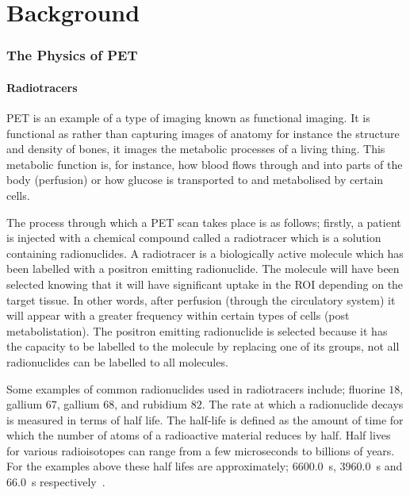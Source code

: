 \chapter{Background} \label{sec:background}
    
    
        
        
        \subsection{The Physics of PET} \label{sec:the_physics_of_pet}
            
            \subsubsection{Radiotracers} \label{sec:radiotracers}
                \gls{PET} is an example of a type of imaging known as functional imaging. It is functional as rather than capturing images of anatomy for instance the structure and density of bones, it images the metabolic processes of a living thing. This metabolic function is, for instance, how blood flows through and into parts of the body (perfusion) or how glucose is transported to and metabolised by certain cells.
                
                The process through which a \gls{PET} scan takes place is as follows; firstly, a patient is injected with a chemical compound called a radiotracer which is a solution containing radionuclides. A radiotracer is a biologically active molecule which has been labelled with a positron emitting radionuclide. The molecule will have been selected knowing that it will have significant uptake in the \gls{ROI} depending on the target tissue. In other words, after perfusion (through the circulatory system) it will appear with a greater frequency within certain types of cells (post metabolistation). The positron emitting radionuclide is selected because it has the capacity to be labelled to the molecule by replacing one of its groups, not all radionuclides can be labelled to all molecules. %
                
                Some examples of common radionuclides used in radiotracers include; fluorine $18$, gallium $67$, gallium $68$, and rubidium $82$. The rate at which a radionuclide decays is measured in terms of half life. The half-life is defined as the amount of time for which the number of atoms of a radioactive material reduces by half. Half lives for various radioisotopes can range from a few microseconds to billions of years. For the examples above these half lifes are approximately; \SI{6600.0}{\second}, \SI{3960.0}{\second} and \SI{66.0}{\second} respectively~.
                
